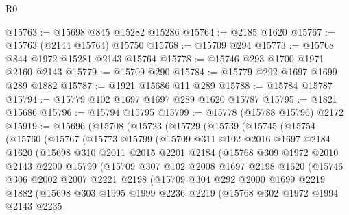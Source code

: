 \begin{lexlean}{R0}
\begin{coremodule}
@15763 := @15698 @845 @15282 @15286
@15764 := @2185 @1620
@15767 := @15763 (@2144 @15764) @15750
@15768 := @15709 @294
@15773 := @15768 @844 @1972 @15281 @2143 @15764
@15778 := @15746 @293 @1700 @1971 @2160 @2143
@15779 := @15709 @290
@15784 := @15779 @292 @1697 @1699 @289 @1882
@15787 := @1921 @15686 @11 @289
@15788 := @15784 @15787
@15794 := @15779 @102 @1697 @1697 @289 @1620 @15787
@15795 := @1821 @15686
@15796 := @15794 @15795
@15799 := @15778 (@15788 @15796) @2172
@15919 := @15696
    (@15708
      (@15723
        (@15729
          (@15739
            (@15745
              (@15754
                (@15760
                  (@15767
                    (@15773
                      @15799
                      (@15709
                        @311
                        @102
                        @2016
                        @1697
                        @2184
                        @1620
                        (@15698
                          @310
                          @2011
                          @2015
                          @2201
                          @2184
                          (@15768
                            @309
                            @1972
                            @2010
                            @2143
                            @2200
                            @15799
                            (@15709
                              @307
                              @102
                              @2008
                              @1697
                              @2198
                              @1620
                              (@15746
                                @306
                                @2002
                                @2007
                                @2221
                                @2198
                                (@15709
                                  @304
                                  @292
                                  @2000
                                  @1699
                                  @2219
                                  @1882
                                  (@15698
                                    @303
                                    @1995
                                    @1999
                                    @2236
                                    @2219
                                    (@15768
                                      @302
                                      @1972
                                      @1994
                                      @2143
                                      @2235

\end{coremodule}
\end{lexlean}
